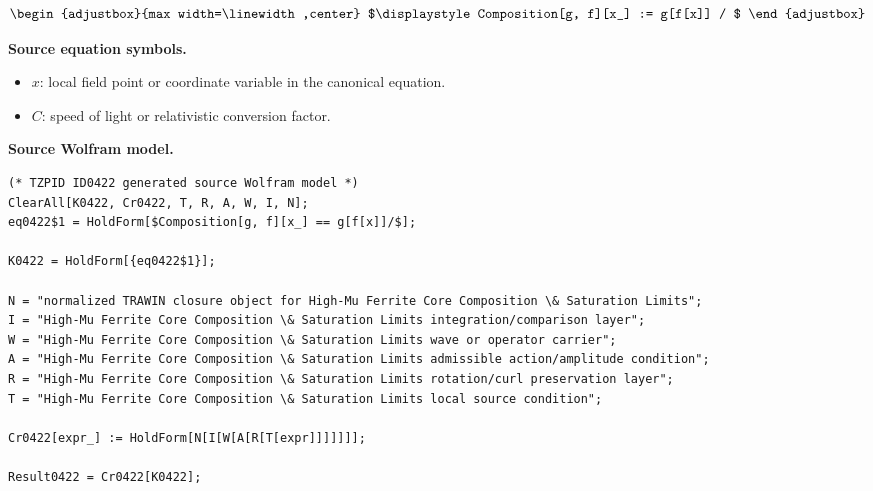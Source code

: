 \[
\begin{adjustbox}{max width=\linewidth,center}
$\displaystyle
Composition[g, f][x_] := g[f[x]] /
$
\end{adjustbox}
\]

\begin{minipage}[t]{0.49\linewidth}
\begingroup
\small
\raggedright
\textbf{Source equation symbols.}\par
\begin{itemize}[leftmargin=1.35em,itemsep=1pt,topsep=1pt,parsep=0pt]
    \item $x$: local field point or coordinate variable in the canonical equation.
    \item $C$: speed of light or relativistic conversion factor.
\end{itemize}
\endgroup
\end{minipage}\hfill
\begin{minipage}[t]{0.47\linewidth}
\begingroup
\scriptsize
\raggedright
\textbf{Source Wolfram model.}\par
\begin{Verbatim}[fontsize=\tiny,breaklines=true,breakanywhere=true]
(* TZPID ID0422 generated source Wolfram model *)
ClearAll[K0422, Cr0422, T, R, A, W, I, N];
eq0422$1 = HoldForm[$Composition[g, f][x_] == g[f[x]]/$];

K0422 = HoldForm[{eq0422$1}];

N = "normalized TRAWIN closure object for High-Mu Ferrite Core Composition \& Saturation Limits";
I = "High-Mu Ferrite Core Composition \& Saturation Limits integration/comparison layer";
W = "High-Mu Ferrite Core Composition \& Saturation Limits wave or operator carrier";
A = "High-Mu Ferrite Core Composition \& Saturation Limits admissible action/amplitude condition";
R = "High-Mu Ferrite Core Composition \& Saturation Limits rotation/curl preservation layer";
T = "High-Mu Ferrite Core Composition \& Saturation Limits local source condition";

Cr0422[expr_] := HoldForm[N[I[W[A[R[T[expr]]]]]]];

Result0422 = Cr0422[K0422];
\end{Verbatim}
\endgroup
\end{minipage}

